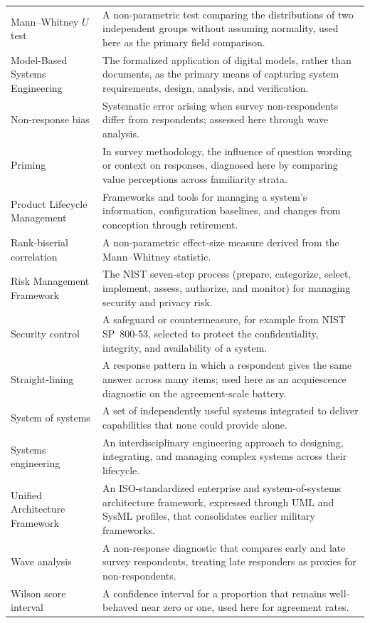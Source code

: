 \begin{singlespace}
\begin{longtable}{p{} p{}}
Mann--Whitney $U$ test & A non-parametric test comparing the distributions of two independent groups without assuming normality, used here as the primary field comparison. \\
Model-Based Systems Engineering & The formalized application of digital models, rather than documents, as the primary means of capturing system requirements, design, analysis, and verification. \\
Non-response bias & Systematic error arising when survey non-respondents differ from respondents; assessed here through wave analysis. \\
Priming & In survey methodology, the influence of question wording or context on responses, diagnosed here by comparing value perceptions across familiarity strata. \\
Product Lifecycle Management & Frameworks and tools for managing a system's information, configuration baselines, and changes from conception through retirement. \\
Rank-biserial correlation & A non-parametric effect-size measure derived from the Mann--Whitney statistic. \\
Risk Management Framework & The NIST seven-step process (prepare, categorize, select, implement, assess, authorize, and monitor) for managing security and privacy risk. \\
Security control & A safeguard or countermeasure, for example from NIST SP~800-53, selected to protect the confidentiality, integrity, and availability of a system. \\
Straight-lining & A response pattern in which a respondent gives the same answer across many items; used here as an acquiescence diagnostic on the agreement-scale battery. \\
System of systems & A set of independently useful systems integrated to deliver capabilities that none could provide alone. \\
Systems engineering & An interdisciplinary engineering approach to designing, integrating, and managing complex systems across their lifecycle. \\
Unified Architecture Framework & An ISO-standardized enterprise and system-of-systems architecture framework, expressed through UML and SysML profiles, that consolidates earlier military frameworks. \\
Wave analysis & A non-response diagnostic that compares early and late survey respondents, treating late responders as proxies for non-respondents. \\
Wilson score interval & A confidence interval for a proportion that remains well-behaved near zero or one, used here for agreement rates. \\
\end{longtable}
\end{singlespace}
